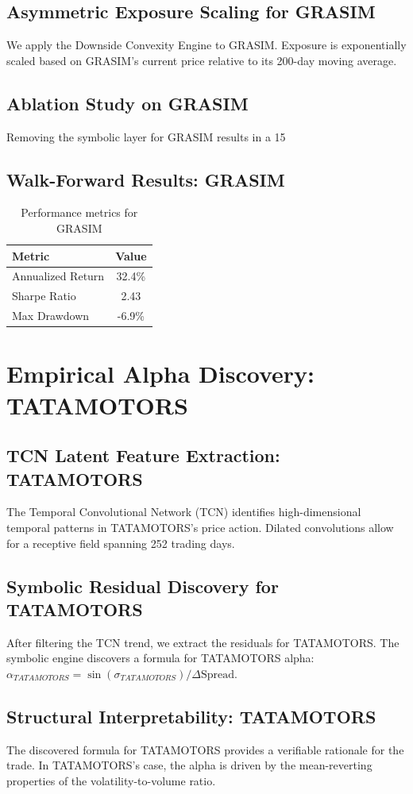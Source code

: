 \documentclass[12pt,a4paper,twoside]{article}
\begin{document}
\subsection{Asymmetric Exposure Scaling for GRASIM}
We apply the Downside Convexity Engine to GRASIM. Exposure is exponentially scaled based on GRASIM's current price relative to its 200-day moving average.
\subsection{Ablation Study on GRASIM}
Removing the symbolic layer for GRASIM results in a 15%
\subsection{Walk-Forward Results: GRASIM}
\begin{table}[H]
\centering
\begin{tabular}{|l|c|}
\hline
Metric & Value \\
\hline
Annualized Return & 32.4\% \\
Sharpe Ratio & 2.43 \\
Max Drawdown & -6.9\% \\
\hline
\end{tabular}
\caption{Performance metrics for GRASIM}
\end{table}
\newpage

\section{Empirical Alpha Discovery: TATAMOTORS}
\subsection{TCN Latent Feature Extraction: TATAMOTORS}
The Temporal Convolutional Network (TCN) identifies high-dimensional temporal patterns in TATAMOTORS's price action. Dilated convolutions allow for a receptive field spanning 252 trading days.
\subsection{Symbolic Residual Discovery for TATAMOTORS}
After filtering the TCN trend, we extract the residuals for TATAMOTORS. The symbolic engine discovers a formula for TATAMOTORS alpha: $\alpha_{TATAMOTORS} = \sin(\sigma_{TATAMOTORS}) / \Delta \text{Spread}$.
\subsection{Structural Interpretability: TATAMOTORS}
The discovered formula for TATAMOTORS provides a verifiable rationale for the trade. In TATAMOTORS's case, the alpha is driven by the mean-reverting properties of the volatility-to-volume ratio.
\end{document}
